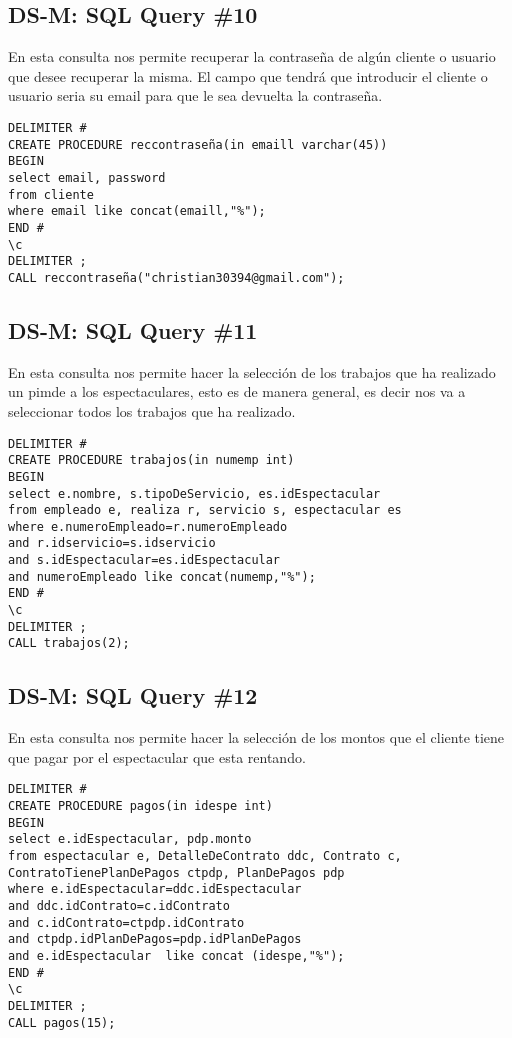 \subsection{DS-M: SQL Query \#10}
En esta consulta nos permite recuperar la contraseña de algún cliente o usuario que desee recuperar la misma. El campo que tendrá que introducir el cliente o usuario seria su email para que le sea devuelta la contraseña.
\begin{verbatim}
DELIMITER #
CREATE PROCEDURE reccontraseña(in emaill varchar(45))
BEGIN
select email, password
from cliente
where email like concat(emaill,"%");
END #
\c 
DELIMITER ;
CALL reccontraseña("christian30394@gmail.com");
\end{verbatim}


\subsection{DS-M: SQL Query \#11}
En esta consulta nos permite hacer la selección de los trabajos que ha realizado un pimde a los espectaculares, esto es de manera general, es decir nos va a seleccionar todos los trabajos que ha realizado.
\begin{verbatim}
DELIMITER #
CREATE PROCEDURE trabajos(in numemp int)
BEGIN
select e.nombre, s.tipoDeServicio, es.idEspectacular
from empleado e, realiza r, servicio s, espectacular es
where e.numeroEmpleado=r.numeroEmpleado
and r.idservicio=s.idservicio
and s.idEspectacular=es.idEspectacular
and numeroEmpleado like concat(numemp,"%");
END #
\c 
DELIMITER ;
CALL trabajos(2);
\end{verbatim}


\subsection{DS-M: SQL Query \#12}
En esta consulta nos permite hacer la selección de los montos que el cliente tiene que pagar por el espectacular que esta rentando.
\begin{verbatim}
DELIMITER #
CREATE PROCEDURE pagos(in idespe int)
BEGIN
select e.idEspectacular, pdp.monto
from espectacular e, DetalleDeContrato ddc, Contrato c, ContratoTienePlanDePagos ctpdp, PlanDePagos pdp
where e.idEspectacular=ddc.idEspectacular
and ddc.idContrato=c.idContrato
and c.idContrato=ctpdp.idContrato
and ctpdp.idPlanDePagos=pdp.idPlanDePagos
and e.idEspectacular  like concat (idespe,"%");
END #
\c 
DELIMITER ;
CALL pagos(15);
\end{verbatim}


